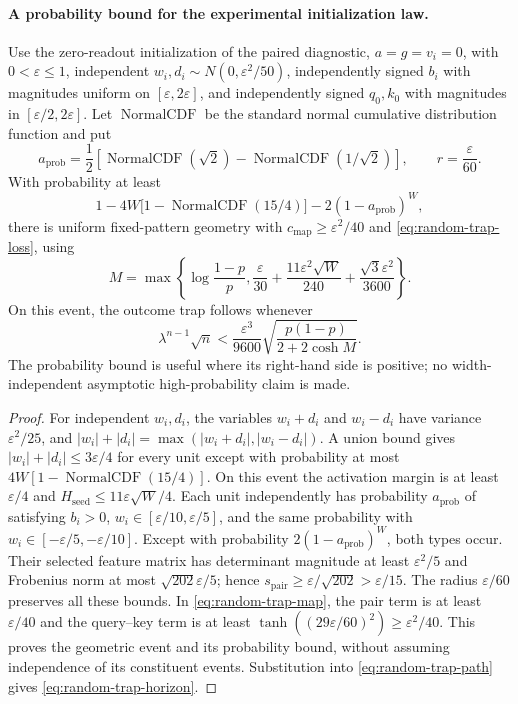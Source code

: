 \paragraph{A probability bound for the experimental initialization law.}
\begin{corollary}
\label{cor:random-trap-geometry}
Use the zero-readout initialization of the paired diagnostic, $a=g=v_i=0$, with $0<\varepsilon\le1$,
independent $w_i,d_i\sim N(0,\varepsilon^2/50)$, independently signed
$b_i$ with magnitudes uniform on $[\varepsilon,2\varepsilon]$, and independently
signed $q_0,k_0$ with magnitudes in $[\varepsilon/2,2\varepsilon]$.
Let $\operatorname{NormalCDF}$ be the standard normal cumulative distribution function and put
\[
 a_{\mathrm{prob}}=\frac12\left[\operatorname{NormalCDF}(\sqrt2)-\operatorname{NormalCDF}(1/\sqrt2)\right],
 \qquad r=\frac\varepsilon{60}.
\]
With probability at least
\begin{equation}
 1-4W\bigl[1-\operatorname{NormalCDF}(15/4)\bigr]-2(1-a_{\mathrm{prob}})^W,
 \label{eq:random-trap-probability}
\end{equation}
there is uniform fixed-pattern geometry with
$c_{\mathrm{map}}\ge\varepsilon^2/40$ and \cref{eq:random-trap-loss}, using
\[
 M=\max\left\{\log\frac{1-p}{p},
 \frac\varepsilon{30}+\frac{11\varepsilon^2\sqrt W}{240}
                   +\frac{\sqrt3\varepsilon^2}{3600}\right\}.
\]
On this event, the outcome trap follows whenever
\begin{equation}
 \lambda^{n-1}\sqrt n
 <\frac{\varepsilon^3}{9600}
   \sqrt{\frac{p(1-p)}{2+2\cosh M}}.
 \label{eq:random-trap-horizon}
\end{equation}
The probability bound is useful where its right-hand side is positive;
no width-independent asymptotic high-probability claim is made.
\end{corollary}
\begin{proof}
For independent $w_i,d_i$, the variables $w_i+d_i$ and $w_i-d_i$ have variance
$\varepsilon^2/25$, and $|w_i|+|d_i|=\max(|w_i+d_i|,|w_i-d_i|)$.
A union bound gives $|w_i|+|d_i|\le3\varepsilon/4$ for every unit except with
probability at most $4W[1-\operatorname{NormalCDF}(15/4)]$. On this event the activation margin is
at least $\varepsilon/4$ and $H_{\mathrm{seed}}\le11\varepsilon\sqrt W/4$.
Each unit independently has probability $a_{\mathrm{prob}}$ of satisfying
$b_i>0$, $w_i\in[\varepsilon/10,\varepsilon/5]$, and the same probability with
$w_i\in[-\varepsilon/5,-\varepsilon/10]$.
Except with probability $2(1-a_{\mathrm{prob}})^W$, both types occur.
Their selected feature matrix has determinant magnitude at least
$\varepsilon^2/5$ and Frobenius norm at most $\sqrt{202}\varepsilon/5$;
hence $s_{\mathrm{pair}}\ge\varepsilon/\sqrt{202}>\varepsilon/15$.
The radius $\varepsilon/60$ preserves all these bounds. In
\cref{eq:random-trap-map}, the pair term is at least $\varepsilon/40$ and the
query--key term is at least $\tanh((29\varepsilon/60)^2)\ge\varepsilon^2/40$.
This proves the geometric event and its probability bound, without assuming
independence of its constituent events. Substitution into \cref{eq:random-trap-path}
gives \cref{eq:random-trap-horizon}.
\end{proof}

